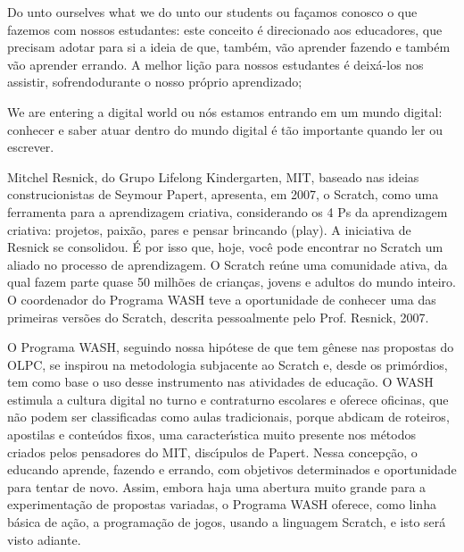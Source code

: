 \documentclass[
12pt,		%
openright,	%
twoside,  %
a4paper,			%
chapter=TITLE,		%
english,			%
french,				%
spanish,			%
brazil				%
]{USPSC-classe/USPSC}
\begin{document}
\begin{alineas}
\item Do unto ourselves what we do unto our students ou \textquotedbl fa\c{c}amos conosco o que fazemos com nossos estudantes\textquotedbl : este conceito \'e direcionado aos educadores, que precisam adotar para si a ideia de que, tamb\'em, v\~ao aprender fazendo e tamb\'em v\~ao aprender errando. A melhor li\c{c}\~ao para nossos estudantes \'e deix\'a-los nos assistir, \textquotedbl sofrendo\textquotedbl  durante o nosso pr\'oprio aprendizado;
\item We are entering a digital world ou \textquotedbl n\'os estamos entrando em um mundo digital\textquotedbl : conhecer e saber atuar dentro do mundo digital \'e t\~ao importante quando ler ou escrever.
\end{alineas}

Mitchel Resnick, do Grupo Lifelong Kindergarten, MIT, baseado nas ideias construcionistas de Seymour Papert, apresenta, em 2007, o Scratch, como uma ferramenta para a aprendizagem criativa, considerando os 4 Ps da aprendizagem criativa: projetos, paix\~ao, pares e pensar brincando (play). A iniciativa de Resnick se consolidou. \'E por isso que, hoje, voc\^e pode encontrar no Scratch um aliado no processo de aprendizagem. O Scratch re\'une uma comunidade ativa, da qual fazem parte quase 50 milh\~oes de crian\c{c}as, jovens e adultos do mundo inteiro. O coordenador do Programa WASH teve a oportunidade de conhecer uma das primeiras vers\~oes do Scratch, descrita pessoalmente pelo Prof. Resnick, 2007.









O Programa WASH, seguindo nossa hip\'otese de que tem g\^enese nas propostas do OLPC, se inspirou na metodologia subjacente ao Scratch e, desde os prim\'ordios, tem como base o uso desse instrumento nas atividades de educa\c{c}\~ao. O WASH estimula a cultura digital no turno e contraturno escolares e oferece oficinas, que n\~ao podem ser classificadas como aulas tradicionais, porque abdicam de roteiros, apostilas e conte\'udos fixos, uma caracter\'{\i}stica muito presente nos m\'etodos criados pelos pensadores do MIT, disc\'{\i}pulos de Papert. Nessa concep\c{c}\~ao, o educando aprende, fazendo e errando, com objetivos determinados e oportunidade para tentar de novo. Assim, embora haja uma abertura muito grande para a experimenta\c{c}\~ao de propostas variadas, o Programa WASH oferece, como linha b\'asica de a\c{c}\~ao, a programa\c{c}\~ao de jogos, usando a linguagem Scratch, e isto ser\'a visto adiante.
\end{document}
